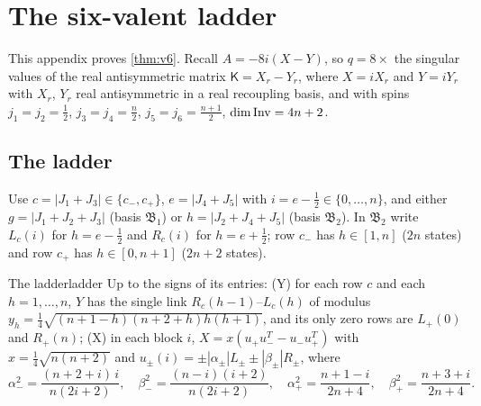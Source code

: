 \section{The six-valent ladder}\label{app:valence6}

This appendix proves \cref{thm:v6}. Recall $A=-8i(X-Y)$, so $q=8\times$ the singular values of
the real antisymmetric matrix $\mathsf K=X_r-Y_r$, where $X=iX_r$ and $Y=iY_r$ with
$X_r$, $Y_r$ real antisymmetric in a real recoupling basis, and with spins $j_1=j_2=\frac12$, $j_3=j_4=\frac n2$,
$j_5=j_6=\frac{n+1}2$, $\dim\operatorname{Inv}=4n+2$.

\subsection{The ladder}

Use $c=|J_1+J_3|\in\{c_-,c_+\}$, $e=|J_4+J_5|$ with $i=e-\frac12\in\{0,\dots,n\}$, and either
$g=|J_1+J_2+J_3|$ (basis $\mathfrak B_1$) or $h=|J_2+J_4+J_5|$ (basis $\mathfrak B_2$). In
$\mathfrak B_2$ write $L_c(i)$ for $h=e-\frac12$ and $R_c(i)$ for $h=e+\frac12$; row $c_-$ has
$h\in[1,n]$ ($2n$ states) and row $c_+$ has $h\in[0,n+1]$ ($2n+2$ states).

\begin{proposition}{The ladder}{ladder}
Up to the signs of its entries:
(Y) for each row $c$ and each $h=1,\dots,n$, $Y$ has the single link $R_c(h-1)$--$L_c(h)$ of
modulus $y_h=\frac14\sqrt{(n+1-h)(n+2+h)h(h+1)}$, and its only zero rows are $L_+(0)$ and
$R_+(n)$;
(X) in each block $i$, $X=x(u_+u_-^T-u_-u_+^T)$ with $x=\frac14\sqrt{n(n+2)}$ and
$u_\pm(i)=\pm|\alpha_\pm|L_\pm\pm|\beta_\pm|R_\pm$, where
\[
  \alpha_-^2=\frac{(n+2+i)\,i}{n(2i+2)},\quad\beta_-^2=\frac{(n-i)(i+2)}{n(2i+2)},\quad
  \alpha_+^2=\frac{n+1-i}{2n+4},\quad\beta_+^2=\frac{n+3+i}{2n+4}.
\]
\end{proposition}

